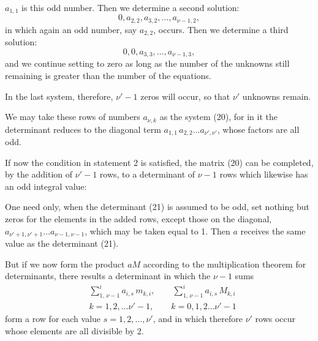 
$a_{1,1}$ is this odd number. Then we determine a
second solution:
\[
0, a_{2,2}, a_{3,2}, \ldots, a_{\nu-1,2},
\]
in which again an odd number, say $a_{2,2}$, occurs. Then we
determine a third solution:
\[
0, 0, a_{3,3}, \ldots, a_{\nu-1,3},
\]
and we continue setting to zero as long as the number of the
unknowns still remaining is greater than the number of the
equations.

In the last system, therefore, $\nu'-1$ zeros will occur, so
that $\nu'$ unknowns remain.

We may take these rows of numbers $a_{\nu,k}$ as the system (20),
for in it the determinant
reduces to the diagonal term $a_{1,1}\, a_{2,2} \ldots a_{\nu',\nu'}$, whose factors are all
 odd.

If now the condition in statement 2 is satisfied, the matrix
(20) can be completed, by the addition of $\nu'-1$ rows, to a
determinant of $\nu-1$ rows which likewise has an odd integral
value:

One need only, when the determinant (21) is assumed to be odd,
set nothing but zeros for the elements in the added rows, except
those on the diagonal,
 $a_{\nu'+1,\nu'+1} \ldots a_{\nu-1,\nu-1}$, which may be taken equal to 1. Then $a$
receives the same value as the determinant
 (21).

But if we now form the product $a M$ according to the
multiplication theorem for determinants, there results a
determinant in which the $\nu-1$ sums
\[
\begin{aligned}
& \sum\limits_{1,\, \nu-1}^{i} a_{i,s}\, m_{k,i}, \qquad \sum\limits_{1,\, \nu-1}^{i} a_{i,s}\, M_{k,i} \\
& k = 1, 2, \ldots \nu'-1, \qquad k = 0, 1, 2 \ldots \nu'-1
\end{aligned}
\]
form a row for each value $s = 1, 2, \ldots, \nu'$, and in which
therefore $\nu'$ rows occur whose elements are all divisible by
 2.
